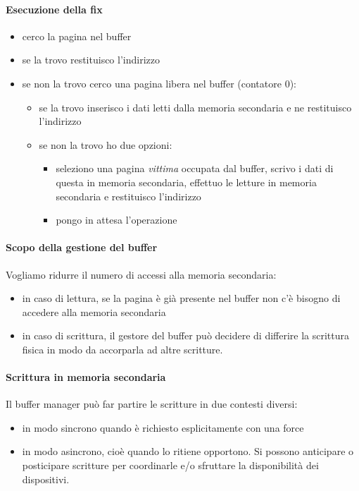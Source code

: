 \paragraph{Esecuzione della fix} 
\begin{itemize}
	\item cerco la pagina nel buffer
	\item se la trovo restituisco l'indirizzo
	\item se non la trovo cerco una pagina libera nel buffer (contatore $0$):
	\begin{itemize}
		\item se la trovo inserisco i dati letti dalla memoria secondaria e ne restituisco l'indirizzo
		\item se non la trovo ho due opzioni:
		\begin{itemize}
			\item seleziono una pagina \emph{vittima} occupata dal buffer, scrivo i dati di questa in memoria secondaria, effettuo le letture in memoria secondaria e restituisco l'indirizzo
			\item pongo in attesa l'operazione
		\end{itemize}
	\end{itemize}
\end{itemize}
\paragraph{Scopo della gestione del buffer} Vogliamo ridurre il numero di accessi alla memoria secondaria:
\begin{itemize}
	\item in caso di lettura, se la pagina è già presente nel buffer non c'è bisogno di accedere alla memoria secondaria
	\item in caso di scrittura, il gestore del buffer può decidere di differire la scrittura fisica in modo da accorparla ad altre scritture.
\end{itemize}
\paragraph{Scrittura in memoria secondaria} Il buffer manager può far partire le scritture in due contesti diversi:
\begin{itemize}
	\item in modo sincrono quando è richiesto esplicitamente con una force
	\item in modo asincrono, cioè quando lo ritiene opportono. Si possono anticipare o posticipare scritture per coordinarle e/o sfruttare la disponibilità dei dispositivi.
\end{itemize}
